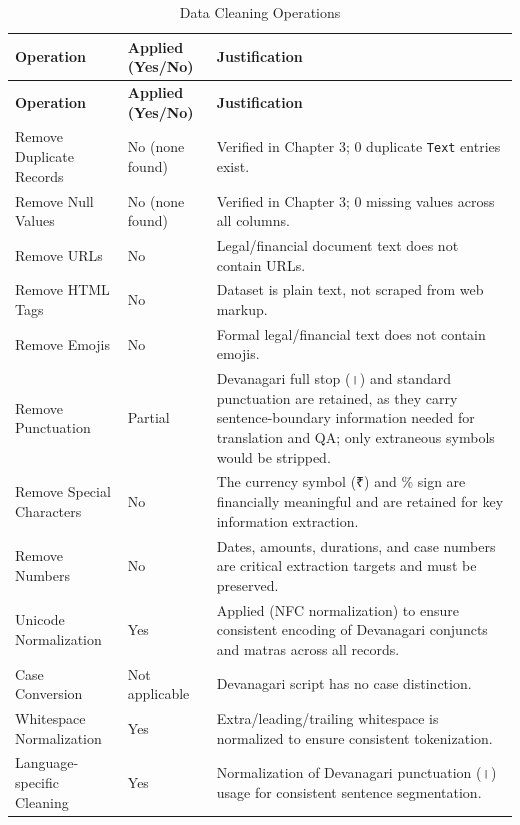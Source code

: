 \begin{longtable}{|p{5cm}|p{3cm}|p{7cm}|}
\caption{Data Cleaning Operations}
\label{tab:cleaning}\\

\hline
\textbf{Operation} &
\textbf{Applied (Yes/No)} &
\textbf{Justification}
\\
\hline
\endfirsthead

\hline
\textbf{Operation} &
\textbf{Applied (Yes/No)} &
\textbf{Justification}
\\
\hline
\endhead

Remove Duplicate Records & No (none found) & Verified in Chapter 3; 0 duplicate \texttt{Text} entries exist. \\ \hline

Remove Null Values & No (none found) & Verified in Chapter 3; 0 missing values across all columns. \\ \hline

Remove URLs & No & Legal/financial document text does not contain URLs. \\ \hline

Remove HTML Tags & No & Dataset is plain text, not scraped from web markup. \\ \hline

Remove Emojis & No & Formal legal/financial text does not contain emojis. \\ \hline

Remove Punctuation & Partial & Devanagari full stop (।) and standard punctuation are retained, as they carry sentence-boundary information needed for translation and QA; only extraneous symbols would be stripped. \\ \hline

Remove Special Characters & No & The currency symbol (₹) and \% sign are financially meaningful and are retained for key information extraction. \\ \hline

Remove Numbers & No & Dates, amounts, durations, and case numbers are critical extraction targets and must be preserved. \\ \hline

Unicode Normalization & Yes & Applied (NFC normalization) to ensure consistent encoding of Devanagari conjuncts and matras across all records. \\ \hline

Case Conversion & Not applicable & Devanagari script has no case distinction. \\ \hline

Whitespace Normalization & Yes & Extra/leading/trailing whitespace is normalized to ensure consistent tokenization. \\ \hline

Language-specific Cleaning & Yes & Normalization of Devanagari punctuation (।) usage for consistent sentence segmentation. \\ \hline

\end{longtable}

